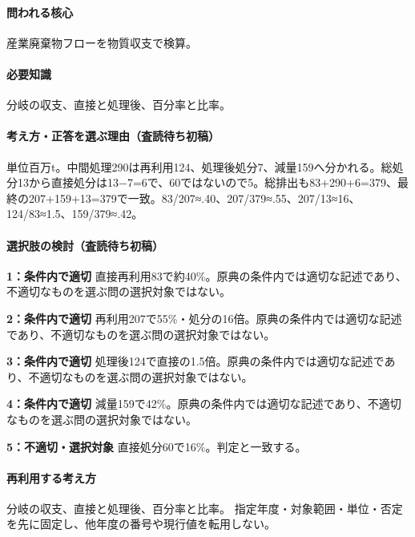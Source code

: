 \paragraph{問われる核心} 産業廃棄物フローを物質収支で検算。

\paragraph{必要知識} 分岐の収支、直接と処理後、百分率と比率。

\paragraph{考え方・正答を選ぶ理由（査読待ち初稿）} 単位百万t。中間処理290は再利用124、処理後処分7、減量159へ分かれる。総処分13から直接処分は13−7=\allowbreak{}6で、60ではないので5。総排出も83+290+6=\allowbreak{}379、最終の207+159+13=\allowbreak{}379で一致。83/207≈.40、207/379≈.55、207/13≈16、124/83≈1.5、159/379≈.42。

\paragraph{選択肢の検討（査読待ち初稿）}\mbox{}\par

\noindent\textbf{1：条件内で適切} 直接再利用83で約40\%。原典の条件内では適切な記述であり、不適切なものを選ぶ問の選択対象ではない。\par

\noindent\textbf{2：条件内で適切} 再利用207で55\%・処分の16倍。原典の条件内では適切な記述であり、不適切なものを選ぶ問の選択対象ではない。\par

\noindent\textbf{3：条件内で適切} 処理後124で直接の1.5倍。原典の条件内では適切な記述であり、不適切なものを選ぶ問の選択対象ではない。\par

\noindent\textbf{4：条件内で適切} 減量159で42\%。原典の条件内では適切な記述であり、不適切なものを選ぶ問の選択対象ではない。\par

\noindent\textbf{5：不適切・選択対象} 直接処分60で16\%。判定と一致する。\par

\paragraph{再利用する考え方} 分岐の収支、直接と処理後、百分率と比率。 指定年度・対象範囲・単位・否定を先に固定し、他年度の番号や現行値を転用しない。

